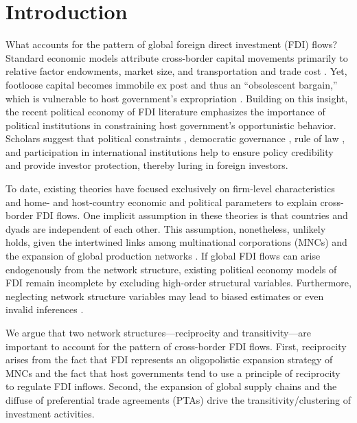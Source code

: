 \documentclass{article}
\begin{document}
\section{Introduction}


What accounts for the pattern of global foreign direct investment (FDI) flows? Standard economic models attribute cross-border capital movements primarily to relative factor endowments, market size, and transportation and trade cost \citep[see,~e.g.,][]{Helpman:1984,Carr_et_al:2001}. Yet, footloose capital becomes immobile ex post and thus an ``obsolescent bargain,'' which is vulnerable to host government's expropriation \citep{Vernon:1971,Vernon:1980}. Building on this insight, the recent political economy of FDI literature emphasizes the importance of political institutions in constraining host government's opportunistic behavior. Scholars suggest that political constraints \citep{Henisz:2000}, democratic governance \citep{Jensen:2003,Jensen:2006}, rule of law \citep{Li_Resnick:2003,Staats_Biglaiser:2012}, and participation in international institutions \citep{Buthe_Milner:2008,Allee_Peinhardt:2011} help to ensure policy credibility and provide investor protection, thereby luring in foreign investors.

To date, existing theories have focused exclusively on firm-level characteristics and home- and host-country economic and political parameters to explain cross-border FDI flows. One implicit assumption in these theories is that countries and dyads are independent of each other. This assumption, nonetheless, unlikely holds, given the intertwined links among multinational corporations (MNCs) and the expansion of global production networks \citep{UNCTAD:2013}. If global FDI flows can arise endogenously from the network structure, existing political economy models of FDI remain incomplete by excluding high-order structural variables. Furthermore, neglecting network structure variables may lead to biased estimates or even invalid inferences \citep{cranmer2011inferential}.

We argue that two network structures---reciprocity and transitivity---are important to account for the pattern of cross-border FDI flows. First, reciprocity arises from the fact that FDI represents an oligopolistic expansion strategy of MNCs and the fact that host governments tend to use a principle of reciprocity to regulate FDI inflows. Second, the expansion of global supply chains and the diffuse of preferential trade agreements (PTAs) drive the transitivity/clustering of investment activities.
\end{document}
